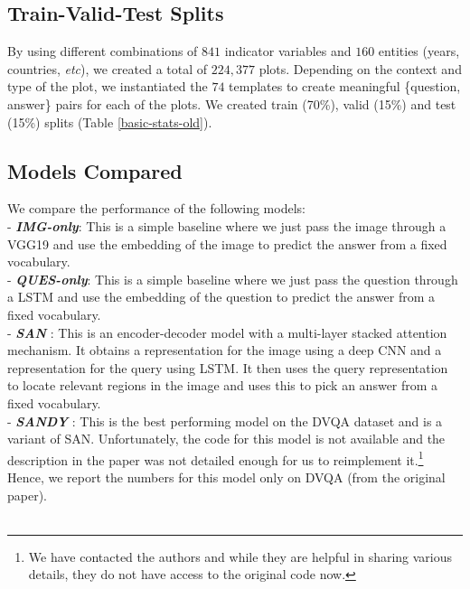 \documentclass[10pt,twocolumn,letterpaper]{article}
\begin{document}
\subsection{Train-Valid-Test Splits} 
By using different combinations of $841$ indicator variables and $160$ entities (years, countries, \textit{etc}), we created a total of $224,377$ plots. 
Depending on the context and type of the plot, we instantiated the $74$ templates to create meaningful \{question, answer\} pairs for each of the plots. 
We created train (70\%), valid (15\%) and test (15\%) splits (Table \ref{basic-stats-old}). 

\subsection{Models Compared}
We compare the performance of the following models:\\
\noindent - \textit{\textbf{IMG-only}}: This is a simple baseline where we just pass the image through a VGG19 and use the embedding of the image to predict the answer from a fixed vocabulary.\\
\noindent - \textit{\textbf{QUES-only}}: This is a simple baseline where we just pass the question through a LSTM and use the embedding of the question to predict the answer from a fixed vocabulary.\\ 
\noindent - \textit{\textbf{SAN}} \cite{SAN}: This is an encoder-decoder model with a multi-layer stacked attention \cite{Attention} mechanism. It obtains a representation for the image using a deep CNN and a representation for the query using LSTM. It then uses the query representation to locate relevant regions in the image and uses this to pick an answer from a fixed vocabulary.\\
\noindent - \textit{\textbf{SANDY}} \cite{DVQA}: This is the best performing model on the DVQA dataset and is a variant of SAN. Unfortunately, the code for this model is not available and the description in the paper was not detailed enough for us to reimplement it.\footnote{We have contacted the authors and while they are helpful in sharing various details, they do not have access to the original code now.} Hence, we report the numbers for this model only on DVQA (from the original paper).\\
\\
\end{document}
